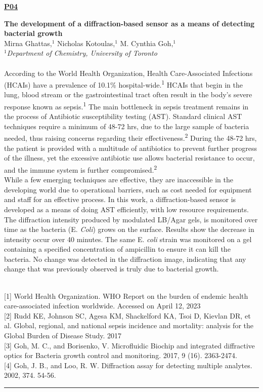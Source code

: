 \documentclass[titlepage,oneside,openany,10pt]{book}
\newenvironment{posterabswref}[5] %
        {
        \newcommand{\posterref}{#5}
	\begin{flushright}
                \underline{\textbf{#4}}
        \end{flushright}
        \textbf{#1}\\%
        #2\\%
        \textit{#3}\\\\%
        }
        {
        \vspace{0.5cm}
        \\\noindent \posterref \\ \noindent\rule{15cm}{0.5pt}%
        }
\begin{document}
\newpage

\begin{posterabswref}
{The development of a diffraction-based sensor as a means of detecting bacterial growth}
{Mirna Ghattas,$^{1}$ Nicholas Kotoulas,$^{1}$ M. Cynthia Goh,$^{1}$}
{
$^1$Department of Chemistry, University of Toronto
}
{P04}
{
{[1]} World Health Organization. WHO Report on the burden of endemic health care-associated infection worldwide. Accessed on April 12, 2023\\
{[2]} Rudd KE, Johnson SC, Agesa KM, Shackelford KA, Tsoi D, Kievlan DR, et al. Global, regional, and national sepsis incidence and mortality: analysis for the Global Burden of Disease Study. 2017\\
{[3]} Goh, M. C., and Borisenko, V. Microfluidic Biochip and integrated diffractive optics for Bacteria growth control and monitoring. 2017, 9 (16). 2363-2474.\\
{[4]} Goh, J. B., and Loo, R. W. Diffraction assay for detecting multiple analytes. 2002, 374. 54-56.
}
According to the World Health Organization, Health Care-Associated Infections (HCAIs) have a prevalence of 10.1\% hospital-wide.\textsuperscript{1} HCAIs that begin in the lung, blood stream or the gastrointestinal tract often result in the body's severe response known as sepsis.\textsuperscript{1} The main bottleneck in sepsis treatment remains in the process of Antibiotic susceptibility testing (AST). Standard clinical AST techniques require a minimum of 48-72 hrs, due to the large sample of bacteria needed, thus raising concerns regarding their effectiveness.\textsuperscript{2} During the 48-72 hrs, the patient is provided with a multitude of antibiotics to prevent further progress of the illness, yet the excessive antibiotic use allows bacterial resistance to occur, and the immune system is further compromised.\textsuperscript{2}\\While a few emerging techniques are effective, they are inaccessible in the developing world due to operational barriers, such as cost needed for equipment and staff for an effective process. In this work, a diffraction-based sensor is developed as a means of doing AST efficiently, with low resource requirements.\\The diffraction intensity produced by modulated LB/Agar gels, is monitored over time as the bacteria (E. \emph{Coli}) grows on the surface. Results show the decrease in intensity occur over 40 minutes. The same E. \emph{coli} strain was monitored on a gel containing a specified concentration of ampicillin to ensure it can kill the bacteria. No change was detected in the diffraction image, indicating that any change that was previously observed is truly due to bacterial growth.
\label{GhattasM}
\end{posterabswref}
\end{document}
